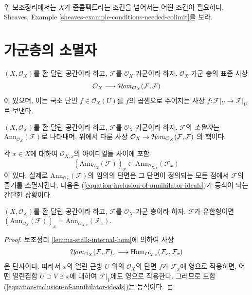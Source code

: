 \begin{remark}
\label{remark-condition-necessary}
위 보조정리에서는 $X$가 준콤팩트라는 조건을 넘어서는 어떤 조건이 필요하다.
Sheaves, Example \ref{sheaves-example-conditions-needed-colimit}을 보라.
\end{remark}




\section{가군층의 소멸자}
\label{section-annihilator}

\noindent
$(X, \mathcal{O}_X)$를 환 달린 공간이라 하고,
$\mathcal{F}$를 $\mathcal{O}_X$-가군이라 하자.
$\mathcal{O}_X$-가군 층의 표준 사상
$$
\mathcal{O}_X
\longrightarrow
\mathop{\mathcal{H}\!\mathit{om}}\nolimits_{\mathcal{O}_X}(\mathcal{F}, \mathcal{F})
$$
이 있으며, 이는 국소 단면 $f \in \mathcal{O}_X(U)$를 $f$의 곱셈으로
주어지는 사상 $f : \mathcal{F}|_U \to \mathcal{F}|_U$로 보낸다.

\begin{definition}
\label{definition-annihilator-sheaf}
$(X, \mathcal{O}_X)$를 환 달린 공간이라 하고, $\mathcal{F}$를
$\mathcal{O}_X$-가군이라 하자. $\mathcal{F}$의 {\it 소멸자}는
$\text{Ann}_{\mathcal{O}_X}(\mathcal{F})$로 나타내며, 위에서 다룬 사상
$\mathcal{O}_X \to \mathop{\mathcal{H}\!\mathit{om}}\nolimits_{\mathcal{O}_X}(\mathcal{F}, \mathcal{F})$
의 핵이다.
\end{definition}

\noindent
각 $x\in X$에 대하여 $\mathcal{O}_{X, x}$의 아이디얼들 사이에 포함
\begin{equation}
\label{equation-inclusion-of-annihilator-ideals}
(\text{Ann}_{\mathcal{O}_X}(\mathcal{F}))_x
\subset
\text{Ann}_{\mathcal{O}_{X, x}}(\mathcal{F}_x)
\end{equation}
이 있다. 실제로 $\text{Ann}_{\mathcal{O}_X}(\mathcal{F})$의 임의의 단면은
그 단면이 정의되는 모든 점에서 $\mathcal{F}$의 줄기를 소멸시킨다.
다음은 (\ref{equation-inclusion-of-annihilator-ideals})가 등식이 되는
간단한 상황이다.

\begin{lemma}
\label{lemma-finite-type-annihilator-stalk}
$(X, \mathcal{O}_X)$를 환 달린 공간이라 하고,
$\mathcal{F}$를 $\mathcal{O}_X$-가군 층이라 하자.
$\mathcal{F}$가 유한형이면
$(\text{Ann}_{\mathcal{O}_X}(\mathcal{F}))_x =
\text{Ann}_{\mathcal{O}_{X, x}}(\mathcal{F}_x)$.
\end{lemma}

\begin{proof}
보조정리 \ref{lemma-stalk-internal-hom}에 의하여 사상
$$
\mathop{\mathcal{H}\!\mathit{om}}\nolimits_{\mathcal{O}_X}(\mathcal{F}, \mathcal{F})_x \longrightarrow
\mathop{\mathrm{Hom}}\nolimits_{\mathcal{O}_{X,x}}(\mathcal{F}_x, \mathcal{F}_x)
$$
은 단사이다. 따라서 $x$의 열린 근방 $U$ 위의 $\mathcal{O}_X$의 단면
$f$가 $\mathcal{F}_x$에 영으로 작용하면, 어떤 열린집합
$U \supset V \ni x$에 대하여 $\mathcal{F}|_V$에도 영으로 작용한다.
그러므로 포함 (\ref{equation-inclusion-of-annihilator-ideals})는 등식이다.
\end{proof}

